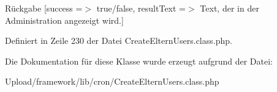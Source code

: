 \begin{DoxyReturn}{Rückgabe}
\mbox{[}\textquotesingle{}success\textquotesingle{} =$>$ \textquotesingle{}true/false\textquotesingle{}, \textquotesingle{}result\+Text\textquotesingle{} =$>$ \textquotesingle{}Text, der in der Administration angezeigt wird.\textquotesingle{}\mbox{]} 
\end{DoxyReturn}


Definiert in Zeile 230 der Datei Create\+Eltern\+Users.\+class.\+php.



Die Dokumentation für diese Klasse wurde erzeugt aufgrund der Datei\+:\begin{DoxyCompactItemize}
\item 
Upload/framework/lib/cron/Create\+Eltern\+Users.\+class.\+php\end{DoxyCompactItemize}
